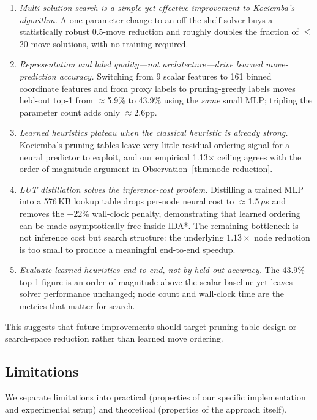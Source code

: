 \documentclass[graybox]{svmult}
\begin{document}
\begin{enumerate}[leftmargin=*, itemsep=0.2em]
  \item \emph{Multi-solution search is a simple yet effective improvement to Kociemba's algorithm.} A one-parameter change to an off-the-shelf solver buys a statistically robust 0.5-move reduction and roughly doubles the fraction of $\leq$20-move solutions, with no training required.
  \item \emph{Representation and label quality---not architecture---drive learned move-prediction accuracy.} Switching from 9 scalar features to 161 binned coordinate features and from proxy labels to pruning-greedy labels moves held-out top-1 from $\approx$5.9\% to 43.9\% using the \emph{same} small MLP; tripling the parameter count adds only $\approx$2.6pp.
  \item \emph{Learned heuristics plateau when the classical heuristic is already strong.} Kociemba's pruning tables leave very little residual ordering signal for a neural predictor to exploit, and our empirical 1.13$\times$ ceiling agrees with the order-of-magnitude argument in Observation~\ref{thm:node-reduction}.
  \item \emph{LUT distillation solves the inference-cost problem.} Distilling a trained MLP into a 576\,KB lookup table drops per-node neural cost to $\approx$1.5\,$\mu$s and removes the $+22\%$ wall-clock penalty, demonstrating that learned ordering can be made asymptotically free inside IDA*. The remaining bottleneck is not inference cost but search structure: the underlying $1.13\times$ node reduction is too small to produce a meaningful end-to-end speedup.
  \item \emph{Evaluate learned heuristics end-to-end, not by held-out accuracy.} The 43.9\% top-1 figure is an order of magnitude above the scalar baseline yet leaves solver performance unchanged; node count and wall-clock time are the metrics that matter for search.
\end{enumerate}

This suggests that future improvements should target pruning-table design or search-space reduction rather than learned move ordering.

\subsection*{Limitations}

We separate limitations into practical (properties of our specific implementation and experimental setup) and theoretical (properties of the approach itself).
\end{document}
